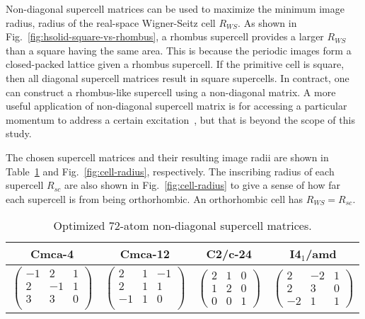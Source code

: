 Non-diagonal supercell matrices can be used to maximize the minimum image radius, radius of the real-space Wigner-Seitz cell $R_{WS}$.
As shown in Fig.~\ref{fig:hsolid-square-vs-rhombus}, a rhombus supercell provides a larger $R_{WS}$ than a square having the same area.
This is because the periodic images form a closed-packed lattice given a rhombus supercell.
If the primitive cell is square, then all diagonal supercell matrices result in square supercells. In contract, one can construct a rhombus-like supercell using a non-diagonal matrix.
A more useful application of non-diagonal supercell matrix is for accessing a particular momentum to address a certain excitation~\cite{Lloyd-Williams2015}, but that is beyond the scope of this study.

The chosen supercell matrices and their resulting image radii are shown in Table~\ref{tab:hsolid-tmat72} and Fig.~\ref{fig:cell-radius}, respectively.
The inscribing radius of each supercell $R_{sc}$ are also shown in Fig.~\ref{fig:cell-radius} to give a sense of how far each supercell is from being orthorhombic. An orthorhombic cell has $R_{WS} = R_{sc}$.
\begin{table}[h]
\centering
\caption{Optimized 72-atom non-diagonal supercell matrices.}
\label{tab:hsolid-tmat72}
\begin{tabular}{cccc}
\hline\hline
Cmca-4 & Cmca-12 & C2/c-24 & I4$_1$/amd \\
\hline
$\left(\begin{array}{rrr}
-1 &  2 &  1 \\
 2 & -1 &  1 \\
 3 &  3 &  0 \\
\end{array}\right)$ & $\left(\begin{array}{rrr}
 2 &  1 &  -1 \\
 2 &  1 &   1 \\
 -1 &  1 &  0 \\
\end{array}\right)$ & $\left(\begin{array}{rrr}
 2 &  1 &  0 \\
 1 &  2 &  0 \\
 0 &  0 &  1
\end{array}\right)$ & $\left(\begin{array}{rrr}
 2 & -2 &  1 \\
 2 &  3 &  0 \\
-2 &  1 &  1
\end{array}\right)$ \\
\hline\hline
\end{tabular}
\end{table}

